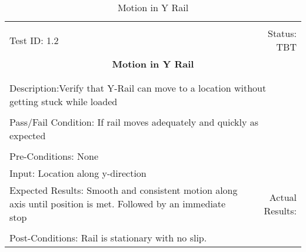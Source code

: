 \documentclass[titlepage]{article}
\begin{document}
\begin{center}%
\begin{table}
\begin{tabular}{|l r|}\hline&\\[-2mm]
	Test ID: 1.2	&Status: TBT\\[-3mm]
	\multicolumn{2}{|c|}{\textbf{\large{Motion in Y Rail}}}\\&\\\hline&\\[-3mm]
	\multicolumn{2}{|p{\textwidth}|}{Description:Verify that Y-Rail can move to a location without getting stuck while loaded}\\[1mm]\hline&\\[-3mm]
	\multicolumn{2}{|p{\textwidth}|}{Pass/Fail Condition: If rail moves adequately and quickly as expected}\\[1mm]\hline&\\[-3mm]
	\multicolumn{2}{|p{\textwidth}|}{Pre-Conditions: None}\\[4mm]
	\multicolumn{2}{|p{\textwidth}|}{Input: Location along y-direction}\\[2mm]\hline
	\multicolumn{1}{|p{0.49\textwidth}}{Expected Results: Smooth and consistent motion along axis until position is met. Followed by an immediate stop}	&\multicolumn{1}{|p{0.45\textwidth}|}{Actual Results:}\\\hline&\\[-3mm]
	\multicolumn{2}{|p{\textwidth}|}{Post-Conditions: Rail is stationary with no slip.}\\\hline
\end{tabular}
\caption{Motion in Y Rail}
\end{table}
\end{center}
\end{document}
